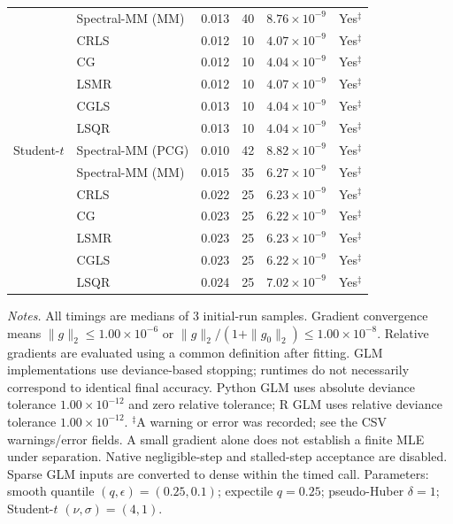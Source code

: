 \begin{longtable}{llrrrc}
 & Spectral-MM (MM) & 0.013 & 40 & $8.76\times10^{-9}$ & Yes$^{\ddagger}$ \\
 & CRLS & 0.012 & 10 & $4.07\times10^{-9}$ & Yes$^{\ddagger}$ \\
 & CG & 0.012 & 10 & $4.04\times10^{-9}$ & Yes$^{\ddagger}$ \\
 & LSMR & 0.012 & 10 & $4.07\times10^{-9}$ & Yes$^{\ddagger}$ \\
 & CGLS & 0.013 & 10 & $4.04\times10^{-9}$ & Yes$^{\ddagger}$ \\
 & LSQR & 0.013 & 10 & $4.04\times10^{-9}$ & Yes$^{\ddagger}$ \\
\midrule
Student-$t$ & Spectral-MM (PCG) & 0.010 & 42 & $8.82\times10^{-9}$ & Yes$^{\ddagger}$ \\
 & Spectral-MM (MM) & 0.015 & 35 & $6.27\times10^{-9}$ & Yes$^{\ddagger}$ \\
 & CRLS & 0.022 & 25 & $6.23\times10^{-9}$ & Yes$^{\ddagger}$ \\
 & CG & 0.023 & 25 & $6.22\times10^{-9}$ & Yes$^{\ddagger}$ \\
 & LSMR & 0.023 & 25 & $6.23\times10^{-9}$ & Yes$^{\ddagger}$ \\
 & CGLS & 0.023 & 25 & $6.22\times10^{-9}$ & Yes$^{\ddagger}$ \\
 & LSQR & 0.024 & 25 & $7.02\times10^{-9}$ & Yes$^{\ddagger}$ \\
\end{longtable}
\noindent\textit{Notes.} All timings are medians of 3 initial-run samples.
Gradient convergence means $\|g\|_2\leq 1.00\times10^{-6}$ or $\|g\|_2/(1+\|g_0\|_2)\leq 1.00\times10^{-8}$.
Relative gradients are evaluated using a common definition after fitting. GLM implementations use deviance-based stopping; runtimes do not necessarily correspond to identical final accuracy.
Python GLM uses absolute deviance tolerance $1.00\times10^{-12}$ and zero relative tolerance; R GLM uses relative deviance tolerance $1.00\times10^{-12}$.
$^{\ddagger}$A warning or error was recorded; see the CSV warnings/error fields. A small gradient alone does not establish a finite MLE under separation.
Native negligible-step and stalled-step acceptance are disabled.
Sparse GLM inputs are converted to dense within the timed call.
Parameters: smooth quantile $(q,\epsilon)=(0.25,0.1)$; expectile $q=0.25$; pseudo-Huber $\delta=1$; Student-$t$ $(\nu,\sigma)=(4,1)$.
\par
\endgroup
